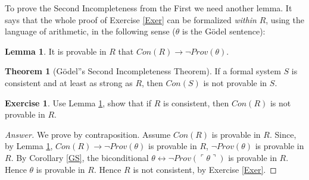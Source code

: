 \documentclass[11pt]{article}
\theoremstyle{definition}
\newtheorem{exer}{Exercise}
\newtheorem{theorem}{Theorem}[section]
\newtheorem{lem}[thm]{Lemma}
\begin{document}
To prove the Second Incompleteness from the First we need another lemma. It says that the whole proof of Exercise \ref{Exer} can be formalized \textit{within} $R$, using the language of arithmetic, in the following sense ($\theta$ is the G\"odel sentence):

\begin{lem} \label{lemma}
It is provable in $R$ that $Con(R) \rightarrow \neg Prov(\theta)$.
\end{lem}

\begin{theorem}[G\"odel''s Second Incompleteness Theorem]
If a formal system $S$ is consistent and at least as strong as $R$, then $Con(S)$ is not provable in $S$.
\end{theorem}

\begin{exer}
Use Lemma \ref{lemma}, show that if $R$ is consistent, then $Con(R)$ is not provable in $R$.
\end{exer}

\begin{proof}[Answer]
We prove by contraposition. Assume $Con(R)$ is provable in $R$. Since, by Lemma \ref{lemma}, $Con(R) \rightarrow \neg Prov(\theta)$ is provable in $R$, $\neg Prov(\theta)$ is provable in $R$. By Corollary \ref{GS}, the biconditional $\theta \leftrightarrow \neg Prov (\ulcorner \theta \urcorner)$ is provable in $R$. Hence $\theta$ is provable in $R$. Hence $R$ is not consistent, by Exercise \ref{Exer}.

\end{proof}
\end{document}
